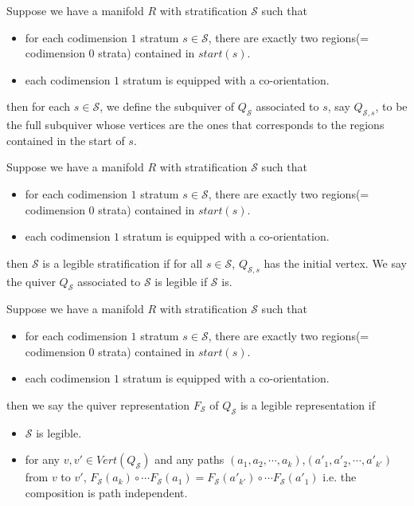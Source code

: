 \begin{definition}
Suppose we have a manifold $R$ with stratification $\mathcal{S}$ such that
\begin{itemize}
\item for each codimension $1$ stratum $s\in \mathcal{S}$, there are exactly two regions(= codimension $0$ strata) contained in $start(s)$.

\item each codimension $1$ stratum is equipped with a co-orientation.
\end{itemize}
then for each $s\in \mathcal{S}$, we define the subquiver of $Q_{\mathcal{S}}$ associated to $s$, say $Q_{\mathcal{S},s}$, to be the full subquiver whose vertices are the ones that corresponds to the regions contained in the start of $s$.
\end{definition}

\begin{definition}
Suppose we have a manifold $R$ with stratification $\mathcal{S}$ such that
\begin{itemize}
\item for each codimension $1$ stratum $s\in \mathcal{S}$, there are exactly two regions(= codimension $0$ strata) contained in $start(s)$.

\item each codimension $1$ stratum is equipped with a co-orientation.
\end{itemize}
then $\mathcal{S}$ is a legible stratification if for all $s\in\mathcal{S}$, $Q_{\mathcal{S},s}$ has the initial vertex. We say the quiver $Q_{\mathcal{S}}$ associated to $\mathcal{S}$ is legible if $\mathcal{S}$ is.
\end{definition}

\begin{definition}
Suppose we have a manifold $R$ with stratification $\mathcal{S}$ such that
\begin{itemize}
\item for each codimension $1$ stratum $s\in \mathcal{S}$, there are exactly two regions(= codimension $0$ strata) contained in $start(s)$.

\item each codimension $1$ stratum is equipped with a co-orientation.
\end{itemize}
then we say the quiver representation $F_{\mathcal{S}}$ of $Q_{\mathcal{S}}$ is a legible representation if
\begin{itemize}
\item $\mathcal{S}$ is legible.

\item for any $v,v' \in Vert(Q_{\mathcal{S}})$ and any paths $(a_1,a_2,\cdots,a_k)$,$(a'_1,a'_2,\cdots,a'_{k'})$ from $v$ to $v'$, $F_{\mathcal{S}}(a_k)\circ \cdots F_{\mathcal{S}}(a_1) = F_{\mathcal{S}}(a'_{k'})\circ \cdots F_{\mathcal{S}}(a'_1) $ i.e. the composition is path independent.
\end{itemize}
\end{definition}

